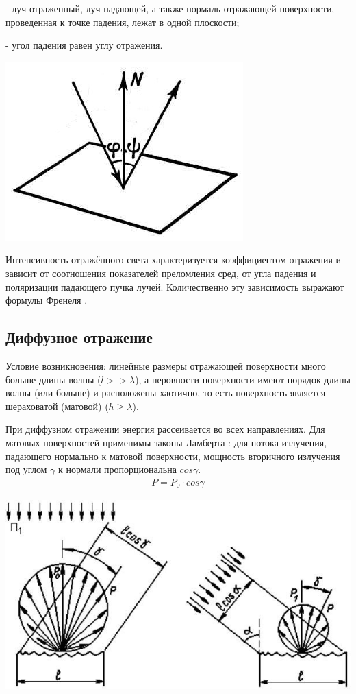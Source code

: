 - луч отраженный, луч падающей, а также нормаль отражающей поверхности, проведенная к точке падения, лежат в одной плоскости;

- угол падения равен углу отражения.

\begin{center}
\includegraphics[width=0.25\linewidth]{zerkalo.jpg}
\end{center}

Интенсивность отражённого света характеризуется коэффициентом отражения и зависит от соотношения показателей преломления сред, от угла падения и поляризации падающего пучка лучей. Количественно эту зависимость выражают формулы Френеля \cite{frenel}.

\subsection*{Диффузное отражение}

Условие возникновения: линейные размеры отражающей поверхности много больше длины волны ($ l >> \lambda $), а неровности поверхности имеют порядок длины волны (или больше) и расположены хаотично, то есть поверхность является шераховатой (матовой) ($ h \ge \lambda $). 

При диффузном отражении энергия рассеивается во всех направлениях. Для матовых поверхностей применимы законы Ламберта \cite{lambert}: для потока излучения, падающего нормально к матовой поверхности, мощность вторичного излучения под углом $ \gamma $ к нормали пропорциональна $ cos \gamma $. 
\begin{gather}
 P = P_0 \cdot cos \gamma
\end {gather}

\begin{center}
\includegraphics[width=0.6\linewidth]{lambert.jpg}
\end{center}

